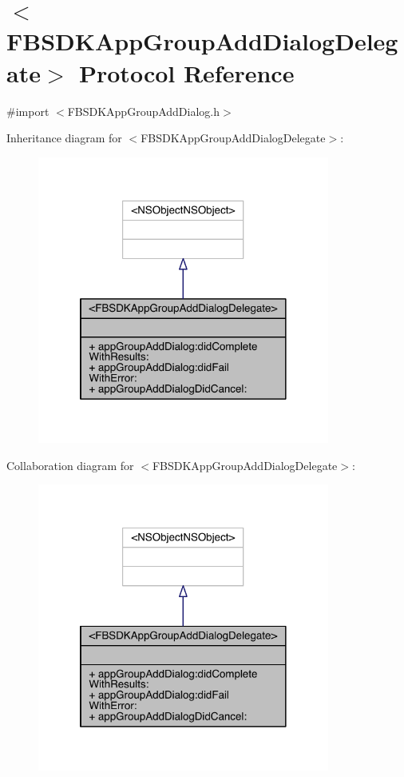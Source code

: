 \hypertarget{protocol_f_b_s_d_k_app_group_add_dialog_delegate-p}{\section{$<$F\-B\-S\-D\-K\-App\-Group\-Add\-Dialog\-Delegate$>$ Protocol Reference}
\label{protocol_f_b_s_d_k_app_group_add_dialog_delegate-p}
}


{\ttfamily \#import $<$F\-B\-S\-D\-K\-App\-Group\-Add\-Dialog.\-h$>$}



Inheritance diagram for $<$F\-B\-S\-D\-K\-App\-Group\-Add\-Dialog\-Delegate$>$\-:
\nopagebreak
\begin{figure}[H]
\begin{center}
\leavevmode
\includegraphics[width=272pt]{protocol_f_b_s_d_k_app_group_add_dialog_delegate-p__inherit__graph}
\end{center}
\end{figure}


Collaboration diagram for $<$F\-B\-S\-D\-K\-App\-Group\-Add\-Dialog\-Delegate$>$\-:
\nopagebreak
\begin{figure}[H]
\begin{center}
\leavevmode
\includegraphics[width=272pt]{protocol_f_b_s_d_k_app_group_add_dialog_delegate-p__coll__graph}
\end{center}
\end{figure}
